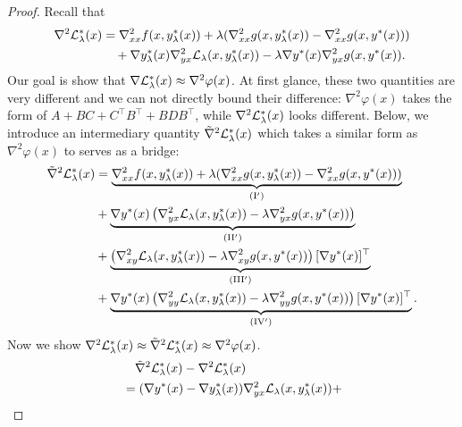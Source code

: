 \begin{proof}
Recall that
\begin{align*}
    \nabla^2 {\mathcal{L}}_{\lambda}^*(x) &= \nabla_{xx}^2  f(x,y_{\lambda}^*(x)) +  \lambda ( \nabla_{xx}^2 g(x,y_{\lambda}^*(x)) - \nabla_{xx}^2 g(x,y^*(x))) \\
    &\quad + \nabla y_{\lambda}^*(x) \nabla_{yx}^2 {\mathcal{L}}_{\lambda}(x,y_{\lambda}^*(x))
    - \lambda \nabla y^*(x) \nabla_{yx}^2 g(x,y^*(x)) .
\end{align*}
{Our goal is show that $\nabla {\mathcal{L}}_{\lambda}^*(x) \approx \nabla^2 \varphi(x)$. At first glance, these two quantities are very different and we can not directly bound their difference: $\nabla^2 \varphi(x)$ takes the form of $A + B C + C^\top B^\top + B D B^\top $, while $\nabla^2 {\mathcal{L}}_{\lambda}^*(x)$ looks different.  Below, we introduce an
intermediary quantity $\tilde \nabla^2 {\mathcal{L}}_{\lambda}^*(x)$ which takes a similar form as $\nabla^2 \varphi(x)$ to serves as a bridge:
}
\begin{align} \label{eq:inter-term}
\begin{split}
        \tilde \nabla^2 {\mathcal{L}}_{\lambda}^*(x) &= \underbrace{\nabla_{xx}^2  f(x,y_{\lambda}^*(x)) +  \lambda ( \nabla_{xx}^2 g(x,y_{\lambda}^*(x)) - \nabla_{xx}^2 g(x,y^*(x)))}_{\rm (I')}\\
    &+  \underbrace{\nabla y^*(x) \left(\nabla_{yx}^2 {\mathcal{L}}_{\lambda}(x,y_{\lambda}^*(x))- \lambda \nabla_{yx}^2 g(x,y^*(x))\right) }_{\rm (II')}\\ 
    & + \underbrace{ \left(\nabla_{xy}^2 {\mathcal{L}}_{\lambda}(x,y_{\lambda}^*(x))- \lambda \nabla_{xy}^2 g(x,y^*(x))\right)[\nabla y^*(x)]^\top }_{\rm (III')} \\
    &+ \underbrace{\nabla y^*(x) \left(\nabla_{yy}^2 {\mathcal{L}}_{\lambda} (x,y_{\lambda}^*(x))   - \lambda \nabla_{yy}^2 g(x,y^*(x)) \right) [\nabla y^*(x)]^\top }_{\rm (IV')}. 
\end{split}
\end{align}
{Now we show $\nabla^2 {\mathcal{L}}_{\lambda}^*(x) \approx \tilde \nabla^2 {\mathcal{L}}_{\lambda}^*(x) \approx \nabla^2 \varphi(x)$.}
\begin{align*}
    &\quad \tilde \nabla^2 \fL_{\lambda}^*(x) - \nabla^2 \fL_{\lambda}^*(x) \\
    &= ( \nabla y^*(x) - \nabla y_{\lambda}^*(x) ) \nabla_{yx}^2 \fL_{\lambda} (x,y_{\lambda}^*(x)) + \\

\end{align*}
\end{proof}
